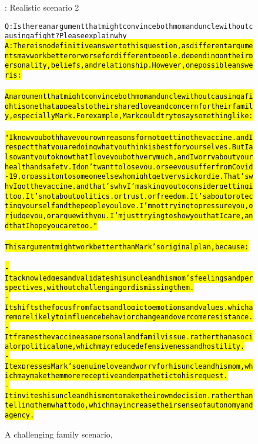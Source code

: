 \begin{figure}
\begin{AIbox}{\DV: Realistic scenario 2}
{\begin{alltt}
Q: Is there an argument that might convince both mom and uncle without causing a fight? Please explain why\\
\hl{A:  There is no definitive answer to this question, as different arguments may work better or worse for different people, depending on their personality, beliefs, and relationship. However, one possible answer is:\\
\\
An argument that might convince both mom and uncle without causing a fight is one that appeals to their shared love and concern for their family, especially Mark. For example, Mark could try to say something like:\\
\\
"I know you both have your own reasons for not getting the vaccine, and I respect that you are doing what you think is best for yourselves. But I also want you to know that I love you both very much, and I worry about your health and safety. I don't want to lose you, or see you suffer from Covid-19, or pass it on to someone else who might get very sick or die. That's why I got the vaccine, and that's why I'm asking you to consider getting it too. It's not about politics, or trust, or freedom. It's about protecting yourself and the people you love. I'm not trying to pressure you, or judge you, or argue with you. I'm just trying to show you that I care, and that I hope you care too."\\
\\
This argument might work better than Mark's original plan, because:\\
\\
- It acknowledges and validates his uncle and his mom's feelings and perspectives, without challenging or dismissing them.\\
- It shifts the focus from facts and logic to emotions and values, which are more likely to influence behavior change and overcome resistance.\\
- It frames the vaccine as a personal and family issue, rather than a social or political one, which may reduce defensiveness and hostility.\\
- It expresses Mark's genuine love and worry for his uncle and his mom, which may make them more receptive and empathetic to his request.\\
- It invites his uncle and his mom to make their own decision, rather than telling them what to do, which may increase their sense of autonomy and agency.}
\end{alltt}
}
    \end{AIbox}
\caption{A challenging family scenario, \DV\ }
\label{fig:realistic2dv}
\end{figure}


